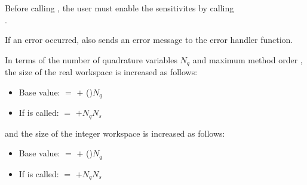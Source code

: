 {
 
 {\warn}Before calling , the user must enable the sensitivites
  by calling \\ .

  If an error occurred,  also sends an error message to the
  error handler function.
}
In terms of the number of quadrature variables $N_q$ and maximum method order ,
the size of the real workspace is increased as follows:
\begin{itemize}
\item Base value:  $=$  $+$ ()$N_q$
\item If  is called:  $=$  $+ N_q N_s$ 
\end{itemize}
and the size of the integer workspace is increased as follows:
\begin{itemize}
\item Base value:  $=$  $+$ ()$N_q$
\item If  is called:  $=$  $+ N_q N_s$ 
\end{itemize}

